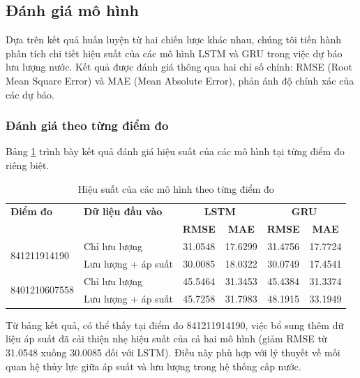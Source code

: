 \subsection{Đánh giá mô hình}

Dựa trên kết quả huấn luyện từ hai chiến lược khác nhau, chúng tôi tiến hành phân tích chi tiết hiệu suất của các mô hình LSTM và GRU trong việc dự báo lưu lượng nước. Kết quả được đánh giá thông qua hai chỉ số chính: RMSE (Root Mean Square Error) và MAE (Mean Absolute Error), phản ánh độ chính xác của các dự báo.

\subsubsection{Đánh giá theo từng điểm đo}

Bảng \ref{tab:model_performance_by_location} trình bày kết quả đánh giá hiệu suất của các mô hình tại từng điểm đo riêng biệt.

\begin{table}[htbp]
    \centering
    \caption{Hiệu suất của các mô hình theo từng điểm đo}
    \label{tab:model_performance_by_location}
    \begin{tabular}{|l|l|c|c|c|c|}
        \hline
        \textbf{Điểm đo} & \textbf{Dữ liệu đầu vào} & \multicolumn{2}{c|}{\textbf{LSTM}} & \multicolumn{2}{c|}{\textbf{GRU}} \\
        \cline{3-6}
        & & \textbf{RMSE} & \textbf{MAE} & \textbf{RMSE} & \textbf{MAE} \\
        \hline
        \multirow{2}{*}{841211914190} & Chỉ lưu lượng & 31.0548 & 17.6299 & 31.4756 & 17.7724 \\
        \cline{2-6}
        & Lưu lượng + áp suất & 30.0085 & 18.0322 & 30.0749 & 17.4541 \\
        \hline
        \multirow{2}{*}{8401210607558} & Chỉ lưu lượng & 45.5464 & 31.3453 & 45.4384 & 31.3374 \\
        \cline{2-6}
        & Lưu lượng + áp suất & 45.7258 & 31.7983 & 48.1915 & 33.1949 \\
        \hline
    \end{tabular}
\end{table}

Từ bảng kết quả, có thể thấy tại điểm đo 841211914190, việc bổ sung thêm dữ liệu áp suất đã cải thiện nhẹ hiệu suất của cả hai mô hình (giảm RMSE từ 31.0548 xuống 30.0085 đối với LSTM). Điều này phù hợp với lý thuyết về mối quan hệ thủy lực giữa áp suất và lưu lượng trong hệ thống cấp nước.

